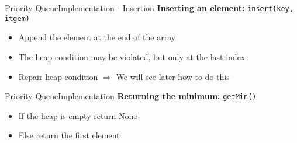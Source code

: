 \begin{frame}{Priority Queue}{Implementation - Insertion}
  \textbf{Inserting an element:}
  {\color{Mittel-Blau}\texttt{insert(key, itgem)}}
  \begin{itemize}
    \item
      Append the element at the end of the array
    \item
      The {\color{Mittel-Blau}heap condition} may be violated, but only at the
      last index
    \item
      Repair {\color{Mittel-Blau}heap condition}
      $\Rightarrow$ We will see later how to do this
  \end{itemize}
  \begin{figure}[!h]
    \begin{adjustbox}{height=0.275\linewidth}
    \end{adjustbox}
    \hspace{-1.5em}
      \begin{adjustbox}{height=0.275\linewidth}
      \end{adjustbox}
      \label{fig:priority_queue:impl_insert}%
    \end{figure}%
\end{frame}


\begin{frame}{Priority Queue}{Implementation}
  \textbf{Returning the minimum:}
  {\color{Mittel-Blau}\texttt{getMin()}}
  \begin{itemize}
    \item
      If the heap is empty return {\color{Mittel-Blau}None}
    \item
      Else return the first element
  \end{itemize}
  \begin{figure}[!h]
    \begin{adjustbox}{height=0.275\linewidth}
    \end{adjustbox}
    \hspace{1.75em}
    \hfill
    \label{fig:priority_queue:impl_peek}%
  \end{figure}%
\end{frame}

